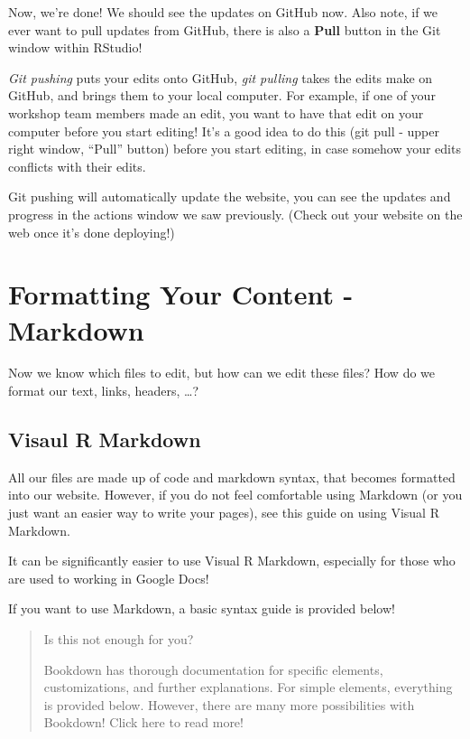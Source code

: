 \documentclass[
]{book}
\theoremstyle{definition}
\theoremstyle{definition}
\theoremstyle{definition}
\theoremstyle{definition}
\theoremstyle{remark}
\begin{document}
Now, we're done! We should see the updates on GitHub now. Also note, if we ever want to pull updates from GitHub, there is also a \textbf{Pull} button in the Git window within RStudio!

\emph{Git pushing} puts your edits onto GitHub, \emph{git pulling} takes the edits make on GitHub, and brings them to your local computer. For example, if one of your workshop team members made an edit, you want to have that edit on your computer before you start editing! It's a good idea to do this (git pull - upper right window, ``Pull'' button) before you start editing, in case somehow your edits conflicts with their edits.

Git pushing will automatically update the website, you can see the updates and progress in the actions window we saw previously. (Check out your website on the web once it's done deploying!)

\chapter{Formatting Your Content - Markdown}\label{formatting}

Now we know which files to edit, but how can we edit these files? How do we format our text, links, headers, \ldots?

\section{Visaul R Markdown}\label{visual-r-md}

All our files are made up of code and markdown syntax, that becomes formatted into our website. However, if you do not feel comfortable using Markdown (or you just want an easier way to write your pages), see this guide on using Visual R Markdown.

It can be significantly easier to use Visual R Markdown, especially for those who are used to working in Google Docs!

If you want to use Markdown, a basic syntax guide is provided below!

\begin{quote}
Is this not enough for you?

Bookdown has thorough documentation for specific elements, customizations, and further explanations. For simple elements, everything is provided below. However, there are many more possibilities with Bookdown! Click here to read more!
\end{quote}
\end{document}
